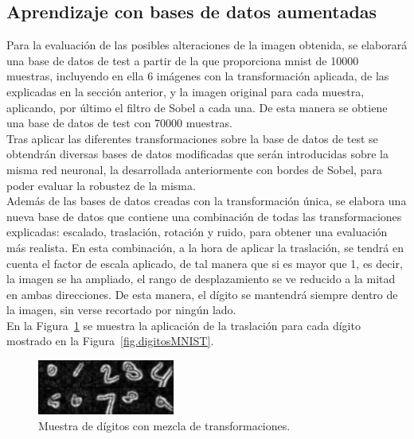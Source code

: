 \subsection{Aprendizaje con bases de datos aumentadas} \label{sec.transformaciones}
Para la evaluación de las posibles alteraciones de la imagen obtenida, se elaborará una base de datos de test a partir de la que proporciona \acrshort{mnist} de 10000 muestras, incluyendo en ella 6 imágenes con la transformación aplicada, de las explicadas en la sección anterior, y la imagen original para cada muestra, aplicando, por último el filtro de Sobel a cada una. De esta manera se obtiene una base de datos de test con 70000 muestras.\\

Tras aplicar las diferentes transformaciones sobre la base de datos de test se obtendrán diversas bases de datos modificadas que serán introducidas sobre la misma red neuronal, la desarrollada anteriormente con bordes de Sobel, para poder evaluar la robustez de la misma.\\

Además de las bases de datos creadas con la transformación única, se elabora una nueva base de datos que contiene una combinación de todas las transformaciones explicadas: escalado, traslación, rotación y ruido, para obtener una evaluación más realista. En esta combinación, a la hora de aplicar la traslación, se tendrá en cuenta el factor de escala aplicado, de tal manera que si es mayor que 1, es decir, la imagen se ha ampliado, el rango de desplazamiento se ve reducido a la mitad en ambas direcciones. De esta manera, el dígito se mantendrá siempre dentro de la imagen, sin verse recortado por ningún lado.\\

En la Figura~\ref{fig.mix} se muestra la aplicación de la traslación para cada dígito mostrado en la Figura~\ref{fig.digitosMNIST}.
\begin{figure}[H]
	\begin{center}
		\includegraphics[width=0.4\textwidth]{figures/mix}
		\caption{Muestra de dígitos con mezcla de transformaciones.}
		\label{fig.mix}
	\end{center}
\end{figure}

